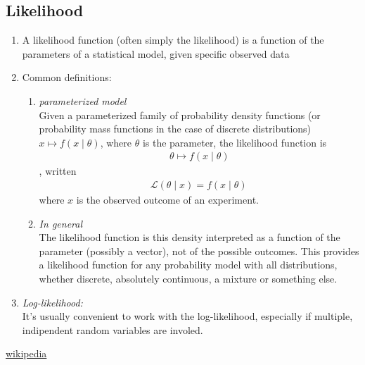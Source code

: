 \subsection{Likelihood}
\begin{enumerate}
	\item A likelihood function (often simply the likelihood) is a function of the parameters of a statistical model, given specific observed data
	\item Common definitions:
	\begin{enumerate}
		\item \textit{parameterized model}\\
		Given a parameterized family of probability density functions (or probability mass functions in the case of discrete distributions) $x\mapsto f(x\mid\theta)$, where $\theta$ is the parameter, the likelihood function is 
		\begin{align*}
			\theta\mapsto f(x\mid\theta)
		\end{align*}
		, written
		\begin{align*}
		\mathcal{L}(\theta \mid x)=f(x\mid\theta)\,
		\end{align*}
		where $x$ is the observed outcome of an experiment.

		\item \textit{In general}\\
		The likelihood function is this density interpreted as a function of the parameter (possibly a vector), not of the possible outcomes. This provides a likelihood function for any probability model with all distributions, whether discrete, absolutely continuous, a mixture or something else.
	\end{enumerate}
	\item \textit{Log-likelihood:}\\
	It's usually convenient to work with the log-likelihood, especially if multiple, indipendent random variables are involed.
\end{enumerate}
\href{https://en.wikipedia.org/wiki/Likelihood_function}{wikipedia}



